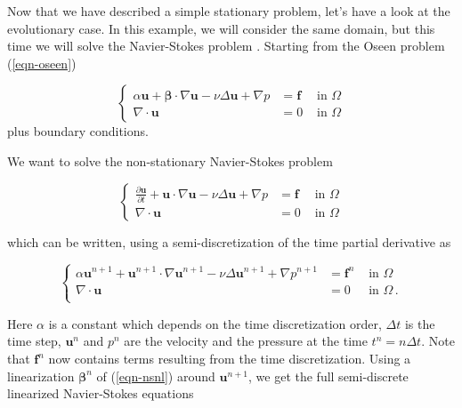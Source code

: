 %
%
%
%
%


Now that we have described a simple stationary problem, let's have a look at the evolutionary
case. In this example, we will consider the same domain, but this time we will solve the
Navier-Stokes problem . Starting from the Oseen problem (\ref{eqn-oseen})

\begin{equation*}
\left\{
\begin{array}{rll}
\displaystyle \alpha \bm{u} + \bm{\beta} \cdot \nabla \bm{u} - \nu \Delta \bm{u}+
\nabla p & = \bm{f}& \mbox{ in } \Omega\\
\displaystyle \nabla \cdot \bm{u} & = 0& \mbox{ in } \Omega
\end{array}
\right.
\end{equation*}
plus boundary conditions.

We want to solve the non-stationary Navier-Stokes problem

\begin{equation*} \label{eqn-navierstokes}
\left\{
\begin{array}{rll}
\displaystyle \frac{\partial \bm{u}}{\partial t} + \bm{u} \cdot \nabla \bm{u} - \nu \Delta \bm{u}+
\nabla p & = \bm{f} & \mbox{ in } \Omega\\
\displaystyle \nabla \cdot \bm{u} & = 0& \mbox{ in } \Omega
\end{array}
\right.
\end{equation*}

\noindent which can be written, using a semi-discretization of the time partial derivative as

\begin{equation*} \label{eqn-nsnl}
\left\{
\begin{array}{rll}
\displaystyle \alpha \bm{u}^{n+1} + \bm{u}^{n+1} \cdot \nabla \bm{u}^{n+1} - \nu \Delta \bm{u}^{n+1}+
\nabla p^{n+1} & = \bm{f}^n& \mbox{ in }\Omega  \\
\displaystyle \nabla \cdot \bm{u} & = 0 & \mbox{ in } \Omega\,. \\
\end{array}
\right.
\end{equation*}

Here $\alpha$ is a constant which depends on the time discretization order, 
$\Delta t$ is the time step, $\bm{u}^{n}$ and $p^{n}$ 
are the velocity and the pressure at the time $t^n = n\Delta t$.
Note that $\bm{f}^n$ now contains terms resulting from the time discretization.
Using a linearization $\bm{\beta}^n$ of (\ref{eqn-nsnl}) around $\bm{u}^{n+1}$, 
we get the full semi-discrete linearized Navier-Stokes
equations

